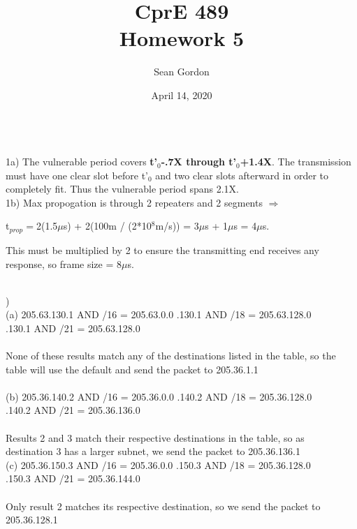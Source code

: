 \documentclass[12pt]{article}
\title{CprE 489\\Homework 5}
\author{Sean Gordon}
\date{April 14, 2020}
\begin{document}
\maketitle


\hrulefill \\


\noindent 1a) The vulnerable period covers {\bf t'$_0$-.7X through t'$_0$+1.4X}. The transmission must have one clear slot before t'$_0$ and two clear slots afterward in order to completely fit. Thus the vulnerable period spans 2.1X.\\

\noindent 1b) Max propogation is through 2 repeaters and 2 segments $\Rightarrow$ \\[-2em]
\begin{center}
t$_{prop} = $2(1.5$\mu$s) + 2(100m / (2*10$^8$m/s)) = 3$\mu$s + 1$\mu$s = 4$\mu$s.
\end{center}
This must be multiplied by 2 to ensure the transmitting end receives any response, so frame size = 8$\mu$s.


\hrulefill \\


) \\
\indent (a) 205.63.130.1 AND /16 = 205.63.0.0 .130.1 AND /18 = 205.63.128.0 \\
\indent {}.130.1 AND /21 = 205.63.128.0\\\\
\indent \indent None of these results match any of the destinations listed in the table, so the \\
\indent \indent table will use the default and send the packet to 205.36.1.1\\\\

\indent (b) 205.36.140.2 AND /16 = 205.36.0.0 .140.2 AND /18 = 205.36.128.0 \\
\indent {}.140.2 AND /21 = 205.36.136.0\\\\
\indent \indent Results 2 and 3 match their respective destinations in the table, so as \\
\indent \indent destination 3 has a larger subnet, we send the packet to 205.36.136.1\\

\indent (c) 205.36.150.3 AND /16 = 205.36.0.0 .150.3 AND /18 = 205.36.128.0 \\
\indent {}.150.3 AND /21 = 205.36.144.0\\\\
\indent \indent Only result 2 matches its respective destination, so we send the packet to 205.36.128.1
\end{document}
